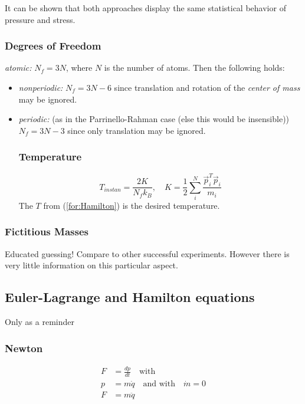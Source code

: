 It can be shown that both approaches display the same statistical behavior of pressure and stress.

\subsubsection{Degrees of Freedom}
\textit{atomic:} \( N_f = 3N \), where \( N\) is the number of atoms. Then the following holds:
\begin{itemize}
\item \textit{nonperiodic:} \(N_f=3N-6\) since translation and rotation of the \textit{center of mass} may be ignored.
\item \textit{periodic:} (as in the Parrinello-Rahman case (else this would be insensible)) \(N_f=3N-3\) since only translation may be ignored.
\subsubsection{Temperature}
\[
T_{instan}=\frac{2K}{N_fk_B}, \quad K = \frac{1}{2}\sum_i^N\frac{\vec{p}_i^T\vec{p}_i}{m_i}
\]
The \(T\) from (\ref{for:Hamilton}) is the desired temperature.
\end{itemize}
\subsubsection{Fictitious Masses}
Educated guessing! Compare to other successful experiments. However there is very little information on this particular aspect.
\subsection{Euler-Lagrange and Hamilton equations}
Only as a reminder 
\subsubsection{Newton}
\begin{equation}
  \begin{split}
    F 
    & = \frac{dp}{dt} \quad \textrm{with} \\
    p 
    & = m\dot{q} \quad \textrm{and with} \quad \dot{m}=0 \\
    F 
    & = m \ddot{q}
  \end{split}
\end{equation}
